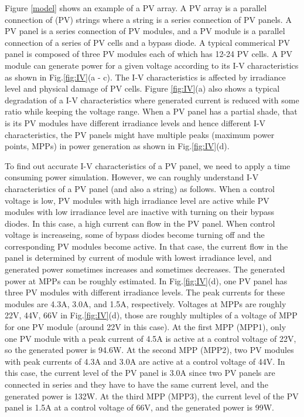\documentclass[conference]{pvsctran}
\begin{document}
Figure \ref{model} shows an example of a PV array. 
A PV array is a parallel connection of (PV) strings where a string is a series connection of PV panels. 
A PV panel is a series connection of PV modules, and a PV module is a parallel connection of a series of PV cells and a bypass diode. 
A typical commerical PV panel is composed of three PV modules each of which has 12-24 PV cells. 
A PV module can generate power for a given voltage according to its I-V characteristics as shown in Fig.\ref{fig:IV}(a - c). 
The I-V characteristics is affected by irradiance level and physical damage of PV cells. 
Figure \ref{fig:IV}(a) also shows a typical degradation of a I-V characteristics where generated current is reduced with some ratio while keeping the voltage range. 
When a PV panel has a partial shade, that is its PV modules have different irradiance levels and hence different I-V characteristics, the PV panels might have multiple peaks (maximum power points, MPPs) in power generation as shown in Fig.\ref{fig:IV}(d). 

To find out accurate I-V characteristics of a PV panel, we need to apply a time consuming power simulation. 
However, we can roughly understand I-V characteristics of a PV panel (and also a string) as follows. 
When a control voltage is low, PV modules with high irradiance level are active while PV modules with low irradiance level are inactive with turning on their bypass diodes.
In this case, a high current can flow in the PV panel. When control voltage is increaseing, some of bypass diodes become turning off and the corresponding PV modules become active. 
In that case, the current flow in the panel is determined by current of module with lowest irradiance level, and generated power sometimes increases and sometimes decreases.
The generated power at MPPs can be roughly estimated. 
In Fig.\ref{fig:IV}(d), one PV panel has three PV modules with different irradiance levels. 
The peak currents for these modules are 4.3A, 3.0A, and 1.5A, respectively. 
Voltages at MPPs are roughly 22V, 44V, 66V in Fig.\ref{fig:IV}(d), those are roughly multiples of a voltage of MPP for one PV module (around 22V in this case). 
At the first MPP (MPP1), only one PV module with a peak current of 4.5A is active at a control voltage of 22V, so the generated power is 94.6W. 
At the second MPP (MPP2), two PV modules with peak currents of 4.3A and 3.0A are active at a control voltage of 44V. 
In this case, the current level of the PV panel is 3.0A since two PV panels are connected in series and they have to have the same current level, and the generated power is 132W.
At the third MPP (MPP3), the current level of the PV panel is 1.5A at a control voltage of 66V, and the generated power is 99W. 
\end{document}
